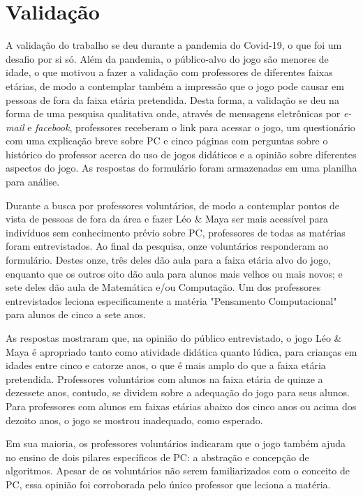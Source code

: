 \documentclass[conference]{IEEEtran}
\begin{document}
\section{Validação}

A validação do trabalho se deu durante a pandemia do Covid-19, o que foi um desafio por si só. Além da pandemia, o público-alvo do jogo são menores de idade, o que motivou a fazer a validação com professores de diferentes faixas etárias, de modo a contemplar também a impressão que o jogo pode causar em pessoas de fora da faixa etária pretendida. Desta forma, a validação se deu na forma de uma pesquisa qualitativa onde, através de mensagens eletrônicas por \textit{e-mail} e \textit{facebook}, professores receberam o link para acessar o jogo, um questionário com uma explicação breve sobre PC e cinco páginas com perguntas sobre o histórico do professor acerca do uso de jogos didáticos e a opinião sobre diferentes aspectos do jogo. As respostas do formulário foram armazenadas em uma planilha para análise.

Durante a busca por professores voluntários, de modo a contemplar pontos de vista de pessoas de fora da área e fazer Léo \& Maya ser mais acessível para indivíduos sem conhecimento prévio sobre PC, professores de todas as matérias foram entrevistados. Ao final da pesquisa, onze voluntários responderam ao formulário. Destes onze, três deles dão aula para a faixa etária alvo do jogo, enquanto que os outros oito dão aula para alunos mais velhos ou mais novos; e sete deles dão aula de Matemática e/ou Computação. Um dos professores entrevistados leciona especificamente a matéria "Pensamento Computacional" para alunos de cinco a sete anos.

As respostas mostraram que, na opinião do público entrevistado, o jogo Léo \& Maya é apropriado tanto como atividade didática quanto lúdica, para crianças em idades entre cinco e catorze anos, o que é mais amplo do que a faixa etária pretendida. Professores voluntários com alunos na faixa etária de quinze a dezessete anos, contudo, se dividem sobre a adequação do jogo para seus alunos. Para professores com alunos em faixas etárias abaixo dos cinco anos ou acima dos dezoito anos, o jogo se mostrou inadequado, como esperado.

Em sua maioria, os professores voluntários indicaram que o jogo também ajuda no ensino de dois pilares específicos de PC: a abstração e concepção de algoritmos. Apesar de os voluntários não serem familiarizados com o conceito de PC, essa opinião foi corroborada pelo único professor que leciona a matéria.
\end{document}
